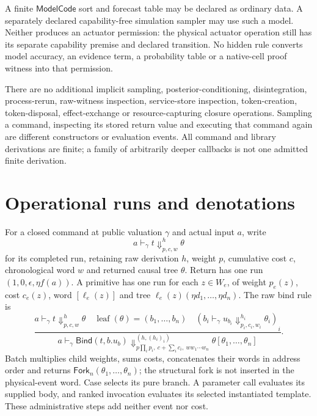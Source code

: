 \documentclass[11pt,a4paper]{article}
\theoremstyle{definition}
\newcommand{\leaf}{\operatorname{leaf}}
\newcommand{\Bind}{\mathsf{Bind}}
\begin{document}
A finite $\mathsf{ModelCode}$ sort and forecast table may be declared as
ordinary data. A separately declared capability-free simulation sampler
may use such a model. Neither produces an actuator permission: the physical
actuator operation still has its separate capability premise and declared
transition. No hidden rule converts model accuracy, an evidence term, a
probability table or a native-cell proof witness into that permission.

There are no additional implicit sampling, posterior-conditioning,
disintegration, process-rerun, raw-witness inspection, service-store
inspection, token-creation, token-disposal, effect-exchange or
resource-capturing closure operations. Sampling a command, inspecting its
stored return value and executing that command again are different
constructors or evaluation events. All command and library derivations
are finite; a family of arbitrarily deeper callbacks is not one admitted
finite derivation.

\section{Operational runs and denotations}\label{sec:semantics}
For a closed command at public valuation $\gamma$ and actual input $a$,
write
\[
 a\vdash_\gamma t\Downarrow^{h}_{p,c,w}\theta
\]
for its completed run, retaining raw derivation $h$, weight $p$, cumulative
cost $c$, chronological word $w$ and returned causal tree $\theta$.
Return has one run $(1,0,\epsilon,\eta f(a))$. A primitive has one run for
each $z\in W_e$, of weight $p_e(z)$, cost $c_e(z)$, word
$[\ell_e(z)]$ and tree $\ell_e(z)(\eta d_1,\ldots,\eta d_n)$.
The raw bind rule is
\begin{equation}\label{eq:eval-bind}
 \frac{a\vdash_\gamma t\Downarrow^h_{p,c,w}\theta
 \quad\leaf(\theta)=(b_1,\ldots,b_n)
 \quad(b_i\vdash_\gamma u_{b_i}
       \Downarrow^{h_i}_{p_i,c_i,w_i}\theta_i)_i}
 {a\vdash_\gamma\Bind(t,b.u_b)
  \Downarrow^{(h,(h_i)_i)}_{p\prod_ip_i,\ c+\sum_ic_i,\ ww_1\cdots w_n}
       \theta[\theta_1,\ldots,\theta_n]}.
\end{equation}
Batch multiplies child weights, sums costs, concatenates their words in
address order and returns $\mathsf{Fork}_n(\theta_1,\ldots,\theta_n)$;
the structural fork is not inserted in the physical-event word. Case
selects its pure branch. A parameter call evaluates its supplied body,
and ranked invocation evaluates its selected instantiated template. These
administrative steps add neither event nor cost.
\end{document}
